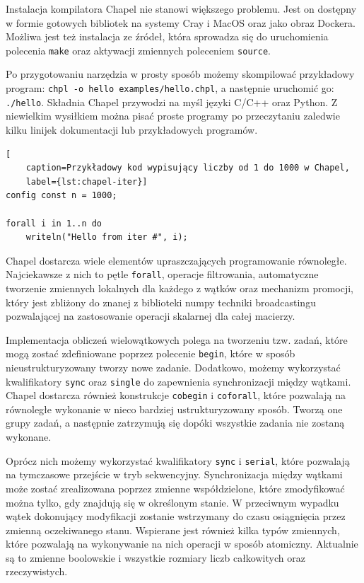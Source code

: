\documentclass[twocolumn]{article}
\begin{document}
Instalacja kompilatora Chapel nie stanowi większego problemu.
Jest on dostępny w formie gotowych bibliotek na systemy Cray i
MacOS oraz jako obraz Dockera.
Możliwa jest też instalacja ze źródeł, która sprowadza się do uruchomienia polecenia
\texttt{make} oraz aktywacji zmiennych poleceniem \texttt{source}.

Po przygotowaniu narzędzia w prosty sposób możemy skompilować przykładowy program:
\texttt{chpl -o hello examples/hello.chpl}, a następnie uruchomić go: \texttt{./hello}.
Składnia Chapel przywodzi na myśl języki C/C++ oraz Python.
Z niewielkim wysiłkiem można
pisać proste programy po przeczytaniu zaledwie kilku linijek dokumentacji lub przykładowych
programów.

\begin{lstlisting}[
    caption=Przykładowy kod wypisujący liczby od 1 do 1000 w Chapel,
    label={lst:chapel-iter}]
config const n = 1000;

forall i in 1..n do
    writeln("Hello from iter #", i);
\end{lstlisting}

Chapel dostarcza wiele elementów upraszczających programowanie równoległe.
Najciekawsze z nich to pętle \texttt{forall}, operacje filtrowania,
automatyczne tworzenie zmiennych lokalnych dla każdego z wątków oraz mechanizm promocji,
który jest zbliżony do znanej z biblioteki numpy techniki
broadcastingu pozwalającej na zastosowanie operacji skalarnej dla całej macierzy.


Implementacja obliczeń wielowątkowych polega na tworzeniu tzw. zadań, które
mogą zostać zdefiniowane poprzez polecenie \texttt{begin}, które w sposób nieustrukturyzowany
tworzy nowe zadanie.
Dodatkowo, możemy wykorzystać kwalifikatory \texttt{sync} oraz \texttt{single}
do zapewnienia synchronizacji między wątkami.
Chapel dostarcza również konstrukcje \texttt{cobegin} i \texttt{coforall}, które pozwalają
na równoległe wykonanie w nieco bardziej ustrukturyzowany sposób.
Tworzą one grupy zadań, a następnie zatrzymują się dopóki wszystkie zadania nie zostaną
wykonane.

Oprócz nich możemy wykorzystać kwalifikatory \texttt{sync} i \texttt{serial},
które pozwalają na tymczasowe przejście w tryb sekwencyjny.
Synchronizacja między wątkami może zostać zrealizowana poprzez zmienne współdzielone,
które zmodyfikować można tylko, gdy znajdują się w określonym stanie.
W przeciwnym wypadku wątek dokonujący modyfikacji zostanie wstrzymany do czasu osiągnięcia
przez zmienną oczekiwanego stanu.
Wspierane jest również kilka typów zmiennych, które pozwalają na wykonywanie na nich operacji
w sposób atomiczny.
Aktualnie są to zmienne boolowskie i wszystkie rozmiary liczb całkowitych oraz rzeczywistych.
\end{document}
